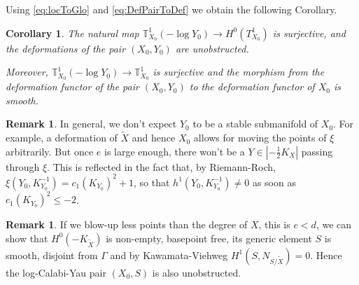 \documentclass[11pt]{article}
\newtheorem{cor}[thm]{Corollary}
\theoremstyle{definition}
\newtheorem{rem}[thm]{Remark}
\newcommand{\abs}[1]{\left\vert#1\right\vert}
\begin{document}
Using \ref{eq:locToGlo} and \ref{eq:DefPairToDef} we obtain the following Corollary.

\begin{cor}
  The natural map $\mathbb{T}_{X_0}^1(-\log Y_0)\to H^0(T_{X_0}^1)$ is surjective, and the deformations of the pair $(X_0,Y_0)$ are unobstructed.
  
  Moreover, $\mathbb{T}_{X_0}^1(-\log Y_0)\to \mathbb{T}_{X_0}^1$ is surjective and the morphism from the deformation functor of the pair $(X_0,Y_0)$ to the deformation functor of $X_0$ is smooth.
\end{cor}

\begin{rem}
  In general, we don't expect $Y_0$ to be a stable submanifold of $X_0$. For example, a deformation of $\tilde X$ and hence $X_0$ allows for moving the points of $\xi$ arbitrarily. 
  But once $e$ is large enough, there won't be a $Y\in \abs{-\frac{1}{2} K_X}$ passing through $\xi$. This is reflected in the fact that, by Riemann-Roch, $\xi(Y_0, K_{Y_0}^{-1})=c_1(K_{Y_0})^2+1$, so that $h^1(Y_0, K_{Y_0}^{-1})\not = 0$ as soon as $c_1(K_{Y_0})^2\leq -2$.
\end{rem}

\begin{rem}
If we blow-up less points than the degree of $X$, this is $e<d$, we can show that $H^0(-K_{\tilde {X}})$ is non-empty, basepoint free, its generic element $S$ is smooth, disjoint from $\Gamma$ and by Kawamata-Viehweg $H^1(S,N_{S/\tilde X})=0$. Hence the log-Calabi-Yau pair $(X_0,S)$ is also unobstructed.
\end{rem}
\end{document}
